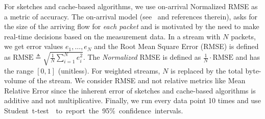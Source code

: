 For sketches and cache-based algorithms, we use on-arrival Normalized RMSE as a metric of accuracy. The on-arrival model (see~\cite{HeavyHitters,RAP,ConextPaper} and references therein), asks for the size of the arriving flow for \emph{each packet} and is motivated by the need to make real-time decisions based on the measurement data. In a stream with $N$ packets, we get error values $e_1,\ldots,e_N$ and the Root Mean Square Error (RMSE) is defined as $\mbox{RMSE}\triangleq\sqrt{\frac{1}{N}\sum_{i=1}^N e_i^2}$. The \emph{Normalized} RMSE is defined as  $\frac{1}{N}\cdot \mbox{RMSE}$ and has the range $[0,1]$ (unitless). For weighted streams, $N$ is replaced by the total byte-volume of the stream. We consider RMSE and not relative metrics like Mean Relative Error since the inherent error of sketches and cache-based algorithms is additive and not multiplicative.
Finally, we run every data point 10 times and use \mbox{Student t-test~\cite{student1908probable} to report the 95\% confidence intervals. }

 
